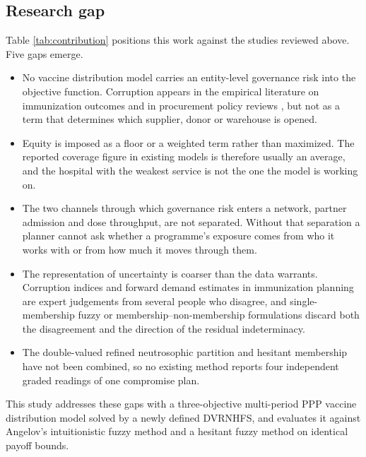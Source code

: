 \documentclass[a4paper]{elsarticle}
\begin{document}
{\subsection{Research gap}
\label{subsec:gap}
Table \ref{tab:contribution} positions this work against the studies reviewed above. Five gaps emerge.
\begin{itemize}
    \item No vaccine distribution model carries an entity-level governance risk into the objective function. Corruption appears in the empirical literature on immunization outcomes \cite{Farzanegan:2021,Spreco:2022,Onwujekwe:2023,Saeed:2025}  and in procurement policy reviews \cite{Griffore:2023,Kohler:2020}, but not as a term that determines which supplier, donor or warehouse is opened.
    \item Equity is imposed as a floor or a weighted term rather than maximized. The reported coverage figure in existing models is therefore usually an average, and the hospital with the weakest service is not the one the model is working on.
    \item The two channels through which governance risk enters a network, partner admission and dose throughput, are not separated. Without that separation a planner cannot ask whether a programme's exposure comes from who it works with or from how much it moves through them.
    \item The representation of uncertainty is coarser than the data warrants. Corruption indices and forward demand estimates in immunization planning are expert judgements from several people who disagree, and single-membership fuzzy \cite{Bellman:1970,Zimmermann:1978} or membership--non-membership \cite{Angelov:1997} formulations discard both the disagreement and the direction of the residual indeterminacy.
    \item The double-valued refined neutrosophic partition \cite{Kandasamy:2018,Freen:2020} and hesitant membership \cite{Torra:2010,Bharati:2018} have not been combined, so no existing method reports four independent graded readings of one compromise plan.
    \end{itemize}
    This study addresses these gaps with a three-objective multi-period PPP vaccine distribution model solved by a newly defined DVRNHFS, and evaluates it against Angelov's intuitionistic fuzzy method and a hesitant fuzzy method on identical payoff bounds.

}
\end{document}
